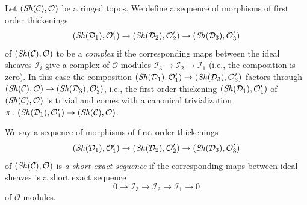 \begin{remark}
\label{remark-short-exact-sequence-thickenings-ringed-topoi}
Let $(\mathop{\mathit{Sh}}\nolimits(\mathcal{C}), \mathcal{O})$ be a ringed topos.
We define a sequence of morphisms of first order thickenings
$$
(\mathop{\mathit{Sh}}\nolimits(\mathcal{D}_1), \mathcal{O}'_1) \to
(\mathop{\mathit{Sh}}\nolimits(\mathcal{D}_2), \mathcal{O}'_2) \to
(\mathop{\mathit{Sh}}\nolimits(\mathcal{D}_3), \mathcal{O}'_3)
$$
of $(\mathop{\mathit{Sh}}\nolimits(\mathcal{C}), \mathcal{O})$ to be a {\it complex}
if the corresponding maps between
the ideal sheaves $\mathcal{I}_i$
give a complex of $\mathcal{O}$-modules
$\mathcal{I}_3 \to \mathcal{I}_2 \to \mathcal{I}_1$
(i.e., the composition is zero). In this case the composition
$(\mathop{\mathit{Sh}}\nolimits(\mathcal{D}_1), \mathcal{O}'_1) \to
(\mathop{\mathit{Sh}}\nolimits(\mathcal{D}_3), \mathcal{O}'_3)$ factors through
$(\mathop{\mathit{Sh}}\nolimits(\mathcal{C}), \mathcal{O}) \to
(\mathop{\mathit{Sh}}\nolimits(\mathcal{D}_3), \mathcal{O}'_3)$, i.e.,
the first order thickening
$(\mathop{\mathit{Sh}}\nolimits(\mathcal{D}_1), \mathcal{O}'_1)$ of
$(\mathop{\mathit{Sh}}\nolimits(\mathcal{C}), \mathcal{O})$ is trivial and comes with
a canonical trivialization
$\pi : (\mathop{\mathit{Sh}}\nolimits(\mathcal{D}_1), \mathcal{O}'_1) \to
(\mathop{\mathit{Sh}}\nolimits(\mathcal{C}), \mathcal{O})$.

\medskip\noindent
We say a sequence of morphisms of first order thickenings
$$
(\mathop{\mathit{Sh}}\nolimits(\mathcal{D}_1), \mathcal{O}'_1) \to
(\mathop{\mathit{Sh}}\nolimits(\mathcal{D}_2), \mathcal{O}'_2) \to
(\mathop{\mathit{Sh}}\nolimits(\mathcal{D}_3), \mathcal{O}'_3)
$$
of $(\mathop{\mathit{Sh}}\nolimits(\mathcal{C}), \mathcal{O})$ is {\it a short exact sequence} if the
corresponding maps between ideal sheaves is a short exact sequence
$$
0 \to \mathcal{I}_3 \to \mathcal{I}_2 \to \mathcal{I}_1 \to 0
$$
of $\mathcal{O}$-modules.
\end{remark}

